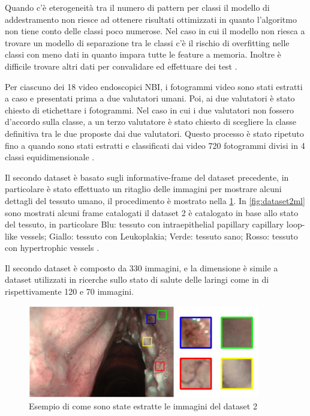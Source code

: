 Quando c'è eterogeneità tra il numero di pattern per classi il modello di addestramento non riesce ad ottenere risultati ottimizzati in quanto l'algoritmo non tiene conto delle classi poco numerose. Nel caso in cui il modello non riesca a trovare un modello di separazione tra le classi c'è il rischio di overfitting nelle classi con meno dati in quanto impara tutte le feature a memoria. Inoltre è difficile trovare altri dati per convalidare ed effettuare dei test \cite{chatterjee_deep_2018}.

Per ciascuno dei 18 video endoscopici NBI, i fotogrammi video sono stati estratti a caso e
presentati prima a due valutatori umani. Poi, ai due valutatori è stato chiesto di etichettare i fotogrammi. Nel caso in cui i due
valutatori non fossero d'accordo sulla classe, a un terzo valutatore è stato
chiesto di scegliere la classe definitiva tra le due proposte
dai due valutatori. Questo processo è stato ripetuto fino a quando sono stati estratti e classificati dai video 720 fotogrammi divisi in 4 classi equidimensionale \cite{moccia_larynge}.

Il secondo dataset è basato sugli informative-frame del dataset precedente, in particolare è stato effettuato un ritaglio delle immagini per mostrare   alcuni dettagli del tessuto umano, il procedimento è mostrato nella \cref{fig:dataset2}. In \cref{fig:dataset2ml} sono mostrati alcuni frame catalogati il dataset 2 è catalogato in base allo stato del tessuto, in particolare Blu: tessuto con intraepithelial papillary capillary loop-like vessels; Giallo: tessuto con Leukoplakia;
Verde: tessuto sano; Rosso: tessuto con hypertrophic vessels \cite{moccia_larynge}.

Il secondo dataset è composto da 330 immagini, e la dimensione è simile a dataset utilizzati in ricerche sullo stato di salute delle laringi come in \cite{narbalata_larynge} \cite{turkmen_larynge} di rispettivamente 120 e 70 immagini.

\begin{figure}[ht]
    \centering
    \includegraphics[width=0.9\textwidth]{introduzione/dataset-2.JPG}
    \caption{Esempio di come sono state estratte le immagini del dataset 2}
    \label{fig:dataset2}
\end{figure}


